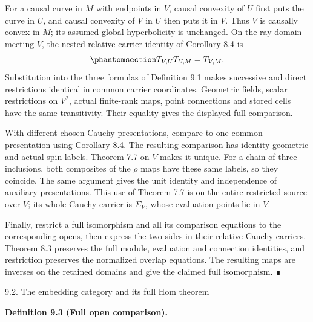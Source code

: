 \documentclass[
  english,
  11pt,
  reqno]{amsart}
\makeatletter
\newcommand{\paperstatementsection}{\@startsection{subsection}{2}%
  \z@{.5\linespacing\@plus.7\linespacing}{.35\baselineskip}%
  {\normalfont\bfseries}}
\newcommand{\paperfirststatement}[1]{%
  {\normalfont\bfseries #1\par}%
  \nobreak\@afterindenttrue\@afterheading}
\makeatother
\begin{document}
For a causal curve in \(M\) with endpoints in \(V\), causal convexity of
\(U\) first puts the curve in \(U\), and causal convexity of \(V\) in
\(U\) then puts it in \(V\). Thus \(V\) is causally convex in \(M\); its
assumed global hyperbolicity is unchanged. On the ray domain meeting
\(V\), the nested relative carrier identity of
\hyperref[cor:relative-carrier-coherence]{Corollary 8.4} is
\begin{equation}\protect\phantomsection\label{eq:global-open-carrier-nested-identity}{
T_{V,U}T_{U,M}=T_{V,M}.
}\end{equation} Substitution into the three formulas of Definition 9.1
makes successive and direct restrictions identical in common carrier
coordinates. Geometric fields, scalar restrictions on \(V^2\), actual
finite-rank maps, point connections and stored cells have the same
transitivity. Their equality gives the displayed full comparison.

With different chosen Cauchy presentations, compare to one common
presentation using Corollary 8.4. The resulting comparison has identity
geometric and actual spin labels. Theorem 7.7 on \(V\) makes it unique.
For a chain of three inclusions, both composites of the \(\rho\) maps
have these same labels, so they coincide. The same argument gives the
unit identity and independence of auxiliary presentations. This use of
Theorem 7.7 is on the entire restricted source over \(V\); its whole
Cauchy carrier is \(\Sigma_V\), whose evaluation points lie in \(V\).

Finally, restrict a full isomorphism and all its comparison equations to
the corresponding opens, then express the two sides in their relative
Cauchy carriers. Theorem 8.3 preserves the full module, evaluation and
connection identities, and restriction preserves the normalized overlap
equations. The resulting maps are inverses on the retained domains and
give the claimed full isomorphism. ∎

\protect{}\label{sec:global-source-embedding-hom}
\paperstatementsection{9.2. The embedding category and its full Hom
theorem}\label{the-embedding-category-and-its-full-hom-theorem}
\paperfirststatement{\protect{}\label{def:global-full-source-open-embedding}Definition 9.3 (Full open comparison).}
\end{document}
